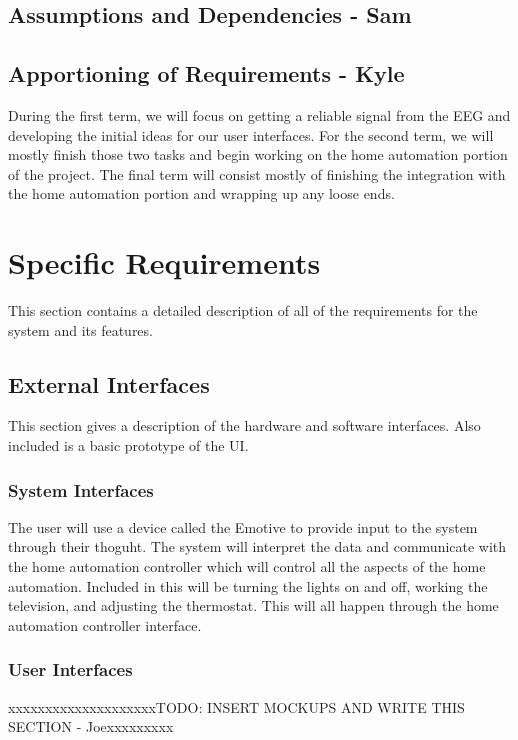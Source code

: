 \documentclass{article}
\begin{document}
\subsection{Assumptions and Dependencies - Sam}

\subsection{Apportioning of Requirements - Kyle}
During the first term, we will focus on getting a reliable signal from the EEG and developing the initial ideas for our user interfaces. For the second term, we will mostly finish those two tasks and begin working on the home automation portion of the project. The final term will consist mostly of finishing the integration with the home automation portion and wrapping up any loose ends.
\newpage

\section{Specific Requirements}
This section contains a detailed description of all of the requirements for the system and its features. 

\subsection{External Interfaces}
This section gives a description of the hardware and software interfaces. Also included is a basic prototype of the UI.

\subsubsection{System Interfaces}

The user will use a device called the Emotive to provide input to the system through their thoguht. The system will interpret the data and communicate with the home automation controller which will control all the aspects of the home automation. Included in this will be turning the lights on and off, working the television, and adjusting the thermostat. This will all happen through the home automation controller interface.

\subsubsection{User Interfaces}
{\color{red}xxxxxxxxxxxxxxxxxxxxTODO: INSERT MOCKUPS AND WRITE THIS SECTION - Joexxxxxxxxx}
\end{document}
